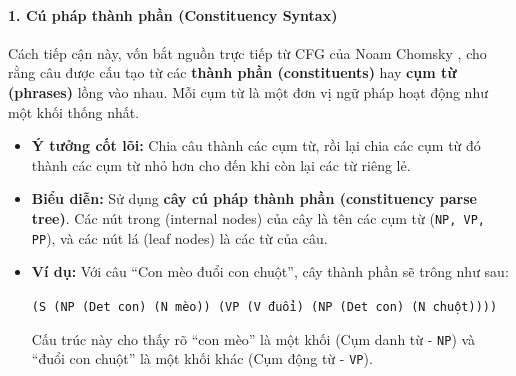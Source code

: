 \paragraph{1. Cú pháp thành phần (Constituency Syntax)}
Cách tiếp cận này, vốn bắt nguồn trực tiếp từ CFG của Noam Chomsky \cite{chomsky1956three}, cho rằng câu được cấu tạo từ các \textbf{thành phần (constituents)} hay \textbf{cụm từ (phrases)} lồng vào nhau. Mỗi cụm từ là một đơn vị ngữ pháp hoạt động như một khối thống nhất.
\begin{itemize}
    \item \textbf{Ý tưởng cốt lõi:} Chia câu thành các cụm từ, rồi lại chia các cụm từ đó thành các cụm từ nhỏ hơn cho đến khi còn lại các từ riêng lẻ.
    \item \textbf{Biểu diễn:} Sử dụng \textbf{cây cú pháp thành phần (constituency parse tree)}. Các nút trong (internal nodes) của cây là tên các cụm từ (\texttt{NP, VP, PP}), và các nút lá (leaf nodes) là các từ của câu.
    \item \textbf{Ví dụ:} Với câu “Con mèo đuổi con chuột”, cây thành phần sẽ trông như sau:
    
    \begin{center}
        \texttt{(S (NP (Det con) (N mèo)) (VP (V đuổi) (NP (Det con) (N chuột))))}
    \end{center}
    
    Cấu trúc này cho thấy rõ “con mèo” là một khối (Cụm danh từ - \texttt{NP}) và “đuổi con chuột” là một khối khác (Cụm động từ - \texttt{VP}).
\end{itemize}

